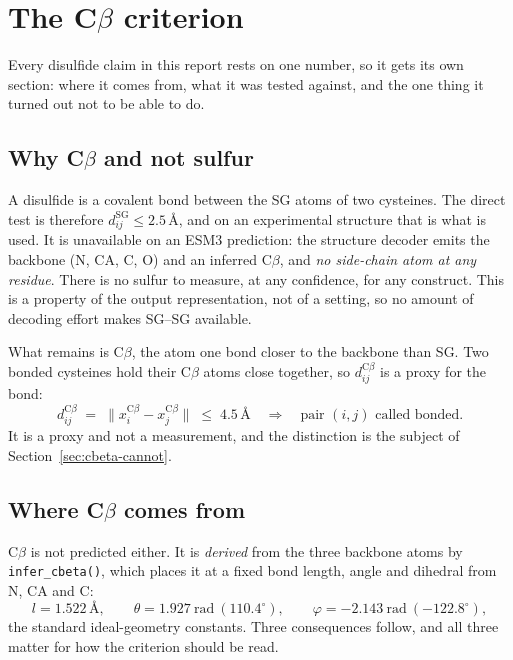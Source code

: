 \documentclass[11pt,a4paper]{article}
\newcommand{\ang}{\,\mbox{\AA}}
\begin{document}
\section{The C\texorpdfstring{$\beta$}{-beta} criterion}
\label{sec:cbeta}

Every disulfide claim in this report rests on one number, so it gets its own
section: where it comes from, what it was tested against, and the one thing it
turned out not to be able to do.

\subsection{Why C\texorpdfstring{$\beta$}{-beta} and not sulfur}

A disulfide is a covalent bond between the SG atoms of two cysteines. The
direct test is therefore $d^{\mathrm{SG}}_{ij} \le 2.5\ang$, and on an
experimental structure that is what is used. It is unavailable on an ESM3
prediction: the structure decoder emits the backbone (N, CA, C, O) and an
inferred C$\beta$, and \emph{no side-chain atom at any residue}. There is no
sulfur to measure, at any confidence, for any construct. This is a property of
the output representation, not of a setting, so no amount of decoding effort
makes SG--SG available.

What remains is C$\beta$, the atom one bond closer to the backbone than SG. Two
bonded cysteines hold their C$\beta$ atoms close together, so
$d^{\mathrm{C}\beta}_{ij}$ is a proxy for the bond:
\[
  d^{\mathrm{C}\beta}_{ij} \;=\; \bigl\lVert x_i^{\mathrm{C}\beta} - x_j^{\mathrm{C}\beta} \bigr\rVert
  \;\le\; 4.5\ang
  \quad\Longrightarrow\quad \text{pair $(i,j)$ called bonded.}
\]
It is a proxy and not a measurement, and the distinction is the subject of
Section~\ref{sec:cbeta-cannot}.

\subsection{Where C\texorpdfstring{$\beta$}{-beta} comes from}
\label{sec:cbeta-origin}

C$\beta$ is not predicted either. It is \emph{derived} from the three backbone
atoms by \texttt{infer\_cbeta()}, which places it at a fixed bond length,
angle and dihedral from N, CA and C:
\[
  l = 1.522\ang, \qquad \theta = 1.927\ \mathrm{rad}\ (110.4^\circ), \qquad
  \varphi = -2.143\ \mathrm{rad}\ (-122.8^\circ),
\]
the standard ideal-geometry constants. Three consequences follow, and all three
matter for how the criterion should be read.
\end{document}
